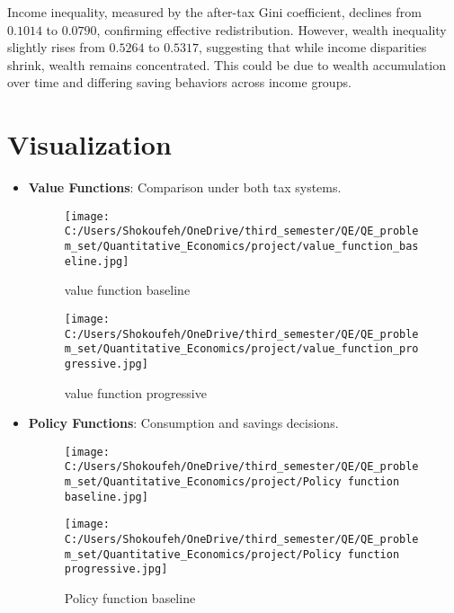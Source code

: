 \documentclass{article}
\begin{document}
Income inequality, measured by the after-tax Gini coefficient, declines from \(0.1014\) to \(0.0790\), confirming effective redistribution. However, wealth inequality slightly rises from \(0.5264\) to \(0.5317\), suggesting that while income disparities shrink, wealth remains concentrated. This could be due to wealth accumulation over time and differing saving behaviors across income groups.




\section{Visualization}

\begin{itemize}
\item \textbf{Value Functions}: Comparison under both tax systems.\\
\begin{figure}[htbp]
\begin{center}
\begin{minipage}{0.45\textwidth}
    \centering
    \texttt{[image: C:/Users/Shokoufeh/OneDrive/third\_semester/QE/QE\_problem\_set/Quantitative\_Economics/project/value\_function\_baseline.jpg]}
    \caption{value function baseline}
\end{minipage}\hfill
\begin{minipage}{0.45\textwidth}
    \centering
    \texttt{[image: C:/Users/Shokoufeh/OneDrive/third\_semester/QE/QE\_problem\_set/Quantitative\_Economics/project/value\_function\_progressive.jpg]}
    \caption{value function progressive}
\end{minipage}
\end{center}
\end{figure}
\FloatBarrier
\item \textbf{Policy Functions}: Consumption and savings decisions.\\
\begin{figure}[htbp]
\begin{center}
\begin{minipage}{0.45\textwidth}
    \centering
    \texttt{[image: C:/Users/Shokoufeh/OneDrive/third\_semester/QE/QE\_problem\_set/Quantitative\_Economics/project/Policy function baseline.jpg]}
    \caption{Policy function baseline}
\end{minipage}\hfill
\begin{minipage}{0.45\textwidth}
    \centering
    \texttt{[image: C:/Users/Shokoufeh/OneDrive/third\_semester/QE/QE\_problem\_set/Quantitative\_Economics/project/Policy function progressive.jpg]}

\end{minipage}
\end{center}
\end{figure}
\end{itemize}
\end{document}

